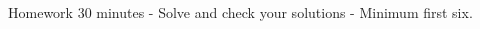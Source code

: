\documentclass[12pt, a4paper, addpoints]{exam}
\newcommand{\elimination}[6]{%
    \pgfmathsetmacro{\cval}{#3*#1 + #5*#2} %
    \pgfmathsetmacro{\pval}{#4*#1 + #6*#2} %

    \def\formata{%
        \ifnum#3=1
            x
        \else\ifnum#3=-1
            -x
        \else
            \pgfmathprintnumber{#3}x
        \fi\fi}

    \def\formatb{%
        \ifnum#5=1
            +y
        \else\ifnum#5=-1
            -y
        \else
            \ifnum#5<0 \pgfmathprintnumber{#5}y \else +\pgfmathprintnumber{#5}y \fi
        \fi\fi}

    \def\formatd{%
        \ifnum#4=1
            x
        \else\ifnum#4=-1
            -x
        \else
            \pgfmathprintnumber{#4}x
        \fi\fi}

    \def\formate{%
        \ifnum#6=1
            +y
        \else\ifnum#6=-1
            -y
        \else
            \ifnum#6<0 \pgfmathprintnumber{#6}y \else +\pgfmathprintnumber{#6}y \fi
        \fi\fi}

    \[
    \begin{aligned}
    \formata \formatb &= \pgfmathprintnumber{\cval} \\[-1pt]
    \formatd \formate &= \pgfmathprintnumber{\pval}
    \end{aligned}
    \]
}
\newcommand{\ms}{\vspace{43mm}}
\newcommand{\verticalspace}{\vspace{51mm}}
\begin{document}
\begin{questions}
\begin{multicols}{2}
\end{multicols}

\ms
\normalsize

\question Homework 30 minutes - Solve and  check your solutions - Minimum first six.
\begin{multicols}{4} %
\end{multicols}
\end{questions}
\end{document}
